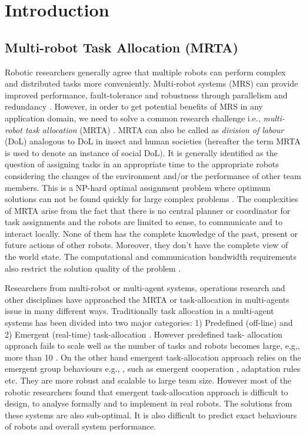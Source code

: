 \chapter{Introduction}
\section{Multi-robot Task Allocation (MRTA)}
Robotic researchers generally agree that multiple robots can perform complex and distributed tasks more conveniently. Multi-robot systems (MRS) can provide improved performance, fault-tolerance and robustness through parallelism and redundancy \cite{Arkin1998,Parker+2006,Mataric2007}. However, in order to get potential benefits of MRS in any application domain, we need to solve a common research challenge i.e., \textit{multi-robot task allocation} (MRTA) \cite{Gerkey+2004}. MRTA can also be called as \textit{division of labour} (DoL) analogous to DoL in insect and human societies (hereafter the term MRTA is used to denote an instance of social DoL). It is generally identified as the question of assigning tasks in an appropriate time to the appropriate robots considering the changes of the environment and/or the performance of other team members. This is a NP-hard optimal assignment problem where optimum solutions can not be found quickly for large complex problems \cite{Gerkey+2003,Parker2008}. The complexities of MRTA arise from the fact that there is no central planner or coordinator for task assignments and the robots are limited to sense, to communicate and to interact locally. None of them has the complete knowledge of the past, present or future actions of other robots. Moreover, they don't have the complete view of the world state. The computational and communication bandwidth requirements also restrict the solution quality of the problem \cite{Lerman+2006}. 

Researchers from multi-robot or multi-agent systems, operations research and other disciplines have approached the MRTA or task-allocation in multi-agents issue in many different ways. Traditionally task allocation in a multi-agent systems has been divided into two major categories: 1) Predefined (off-line) and 2) Emergent (real-time) task-allocation \cite{Shen+2001}. However predefined task- allocation approach fails to scale well as the number of tasks and robots becomes large, e,g,, more than 10 \cite{Lerman+2006}. On the other hand emergent task-allocation approach relies on the emergent group behaviours e.g., \cite{Kube+1993}, such as emergent cooperation \cite{Lerman+2006}, adaptation rules \cite{Liu+2007} etc. They are more robust and scalable to large team size. However most of the robotic researchers found that emergent task-allocation approach is difficult to design, to analyse formally and to implement in real robots. The solutions from these systems are also sub-optimal. It is also difficult to predict exact behaviours of robots and overall system performance.

